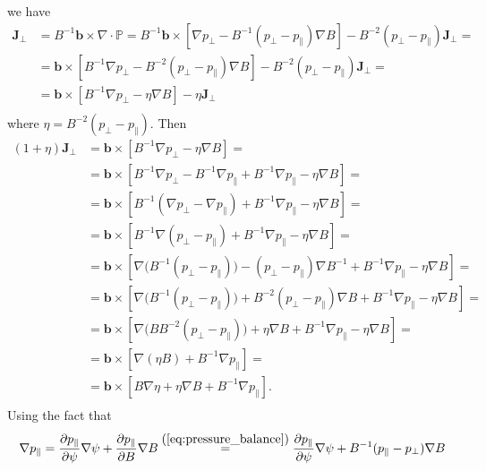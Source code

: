 we have
\begin{equation*}
  \begin{split}
    \mathbf{J}_\perp&=B^{-1}\mathbf{b}\times\nabla\cdot\mathbb{P}= B^{-1}\mathbf{b}\times[\nabla p_\perp-B^{-1}(p_\perp-p_\parallel)\nabla B]-B^{-2}(p_\perp-p_\parallel)\mathbf{J}_\perp=\\\
    &=\mathbf{b}\times[B^{-1}\nabla p_\perp-B^{-2}(p_\perp-p_\parallel)\nabla B]-B^{-2}(p_\perp-p_\parallel)\mathbf{J}_\perp=\\
    &=\mathbf{b}\times[B^{-1}\nabla p_\perp-\eta\nabla B]-\eta\mathbf{J}_\perp\\
  \end{split}
\end{equation*}
where $\eta=B^{-2}(p_\perp-p_\parallel)$. Then
\begin{equation*}
  \begin{split}
    (1+\eta)\mathbf{J}_\perp&=\mathbf{b}\times[B^{-1}\nabla p_\perp-\eta\nabla B]=\\
    &=\mathbf{b}\times[B^{-1}\nabla p_\perp-B^{-1}\nabla p_\parallel+B^{-1}\nabla p_\parallel-\eta\nabla B]=\\
    &=\mathbf{b}\times[B^{-1}(\nabla p_\perp-\nabla p_\parallel)+B^{-1}\nabla p_\parallel-\eta\nabla B]=\\
    &=\mathbf{b}\times[B^{-1}\nabla( p_\perp- p_\parallel)+B^{-1}\nabla p_\parallel-\eta\nabla B]=\\
    &=\mathbf{b}\times[\nabla\big(B^{-1}(p_\perp- p_\parallel)\big)-(p_\perp- p_\parallel)\nabla B^{-1}+B^{-1}\nabla p_\parallel-\eta\nabla B]=\\
    &=\mathbf{b}\times[\nabla\big(B^{-1}(p_\perp- p_\parallel)\big)+B^{-2}(p_\perp- p_\parallel)\nabla B+B^{-1}\nabla p_\parallel-\eta\nabla B]=\\
    &=\mathbf{b}\times[\nabla\big(BB^{-2}(p_\perp- p_\parallel)\big)+\eta\nabla B+B^{-1}\nabla p_\parallel-\eta\nabla B]=\\
    &=\mathbf{b}\times[\nabla(\eta B)+B^{-1}\nabla p_\parallel]=\\
    &=\mathbf{b}\times[B\nabla\eta+\eta\nabla B+B^{-1}\nabla p_\parallel].\\
  \end{split}
\end{equation*}
Using the fact that
\begin{equation*}
  \nabla p_\parallel=\frac{\partial p_\parallel}{\partial \psi}\nabla\psi+\frac{\partial p_\parallel}{\partial B}\nabla B \overset{\mbox{(\ref{eq:pressure_balance})}}{=}
  \frac{\partial p_\parallel}{\partial \psi}\nabla\psi+B^{-1}(p_\parallel-p_\perp)\nabla B
\end{equation*}
